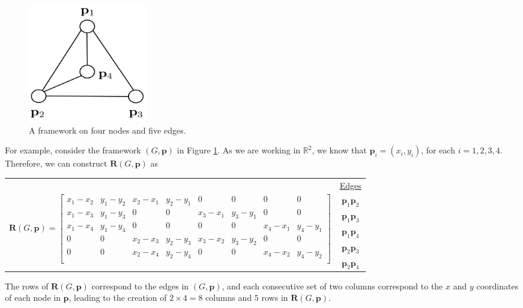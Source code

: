 \begin{figure}[htbp]
    \centering
    \includegraphics[width = 0.25\textwidth]{Chapter 3/4. rigidity_matrix.png}
    \caption{A framework on four nodes and five edges.}
    \label{fig: rigidity_matrix}
\end{figure}
\vspace{-3 mm}
\begin{flushleft}
For example, consider the framework $(G,\mathbf{p})$ in Figure \ref{fig: rigidity_matrix}. As we are working in $\mathbb{R}^2$, we know that $\mathbf{p}_i = (x_{i}, y_{i})$, for each $i = 1,2,3,4$. Therefore, we can construct $\mathbf{R}(G,\mathbf{p})$ as
\end{flushleft}
\vspace{-6 mm}
\begin{center}
\begin{tabular}{ c c } 
 & \underline{Edges} \\
\multirow{5}{15 cm}{$
    \mathbf{R}(G,\mathbf{p}) = 
    \begin{bmatrix}
    x_1 - x_2 & y_1 - y_2 & x_2 - x_1 & y_2 - y_1 & 0 & 0 & 0 & 0 \\ %
    x_1 - x_3 & y_1 - y_3 & 0 & 0 & x_3 - x_1 & y_3 - y_1 & 0 & 0 \\ %
    x_1 - x_4 & y_1 - y_4 & 0 & 0 & 0 & 0 & x_4 - x_1 & y_4 - y_1 \\ %
    0 & 0 & x_2 - x_3 & y_2 - y_3 & x_3 - x_2 & y_3 - y_2 & 0 & 0 \\ %
    0 & 0 & x_2 - x_4 & y_2 - y_4 & 0 & 0 & x_4 - x_2 & y_4 - y_2 \\ %
    \end{bmatrix}$} & $\mathbf{p}_1\mathbf{p}_2$ \\
    & $\mathbf{p}_1\mathbf{p}_3$ \\
    & $\mathbf{p}_1\mathbf{p}_4$ \\
    & $\mathbf{p}_2\mathbf{p}_3$ \\
    & $\mathbf{p}_2\mathbf{p}_4$ \\    
\end{tabular}
\end{center}
\vspace{0.5 mm}
\begin{flushleft}
The rows of $\mathbf{R}(G,\mathbf{p})$ correspond to the edges in $(G,\mathbf{p})$, and each consecutive set of two columns correspond to the $x$ and $y$ coordinates of each node in $\mathbf{p}$, leading to the creation of $2 \times 4 = 8$ columns and $5$ rows in $\mathbf{R}(G,\mathbf{p})$.
\end{flushleft}

